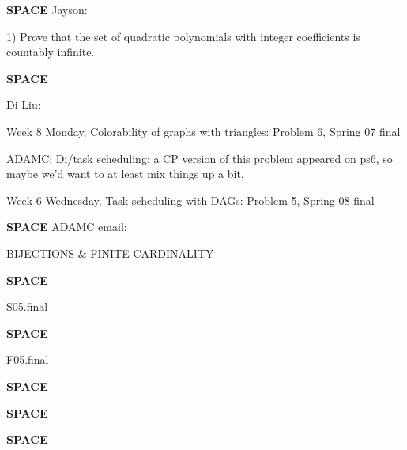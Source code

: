 \documentclass[quiz]{mcs}
\renewcommand{\examspace}{\textbf{SPACE}\newline}
\begin{document}

\examspace
Jayson:

1) Prove that the set of quadratic polynomials with integer
coefficients is countably infinite.

\examspace
\begin{editingnotes}Di Liu:

Week 8 Monday, Colorability of graphs with triangles: Problem 6,
Spring 07 final

ADAMC: Di/task scheduling: a CP version of this problem appeared on
ps6, so maybe we'd want to at least mix things up a bit.

Week 6 Wednesday, Task scheduling with DAGs: Problem 5, Spring 08 final
\end{editingnotes}


\examspace
ADAMC email:

BIJECTIONS \& FINITE CARDINALITY

\examspace
\begin{editingnotes}S05.final\end{editingnotes}



\examspace
\begin{editingnotes}F05.final\end{editingnotes}


\examspace
{}

\examspace
{}

\examspace
{}
\end{document}
